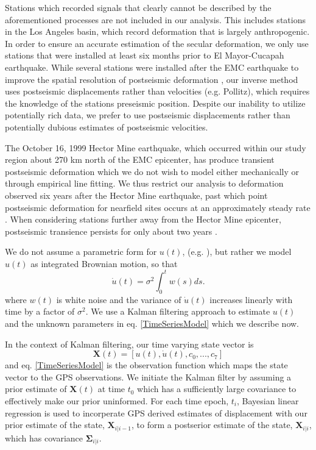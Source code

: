 \documentclass[12pt]{article}
\begin{document}
  Stations which recorded signals that clearly cannot be described by
  the aforementioned processes are not included in our analysis. This
  includes stations in the Los Angeles basin, which record deformation
  that is largely anthropogenic. In order to ensure an accurate
  estimation of the secular deformation, we only use stations that
  were installed at least six months prior to El Mayor-Cucapah
  earthquake. While several stations were installed after the EMC
  earthquake to improve the spatial resolution of postseismic
  deformation \cite{S2015}, our inverse method uses postseismic
  displacements rather than velocities (e.g. Pollitz), which requires
  the knowledge of the stations preseismic position. Despite our
  inability to utilize potentially rich data, we prefer to use
  postseismic displacements rather than potentially dubious estimates
  of postseismic velocities.

  The October 16, 1999 Hector Mine earthquake, which occurred within
  our study region about 270 km north of the EMC epicenter, has
  produce transient postseismic deformation which we do not wish to
  model either mechanically or through empirical line fitting. We thus
  restrict our analysis to deformation observed six years after the
  Hector Mine earthquake, past which point postseismic deformation for
  nearfield sites occurs at an approximately steady rate
  \cite{SS2009}. When considering stations further away from the
  Hector Mine epicenter, postseismic transience persists for only
  about two years \cite{S2015}.

  We do not assume a parametric form for $u(t)$, (e.g. \cite{R2015}),
  but rather we model $u(t)$ as integrated Brownian motion, so that
  \begin{equation}
    \dot{u}(t) = \sigma^2\int_0^t w(s) ds.
  \end{equation}    
  where $w(t)$ is white noise and the variance of $\dot{u}(t)$
  increases linearly with time by a factor of $\sigma^2$. We use a
  Kalman filtering approach to estimate $u(t)$ and the unknown
  parameters in eq. \ref{TimeSeriesModel} which we describe now. 

  In the context of Kalman filtering, our time varying state vector is
  \begin{equation}
    \mathbf{X}(t) = [u(t),\dot u(t), c_0, ..., c_7]
  \end{equation}
  and eq. \ref{TimeSeriesModel} is the observation function which maps
  the state vector to the GPS observations. We initiate the Kalman
  filter by assuming a prior estimate of $\mathbf{X}(t)$ at time $t_0$ which
  has a sufficiently large covariance to effectively make our prior
  uninformed.  For each time epoch, $t_i$, Bayesian linear regression
  is used to incorperate GPS derived estimates of displacement with
  our prior estimate of the state, $\mathbf{X}_{i|i-1}$, to form a postserior
  estimate of the state, $\mathbf{X}_{i|i}$, which has covariance
  $\mathbf{\Sigma}_{i|i}$.  
\end{document}

